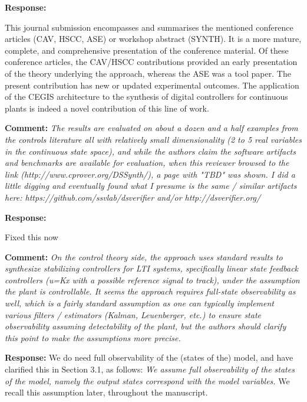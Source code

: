 \documentclass{article}
\begin{document}
{\bf Response: }

This journal submission encompasses and summarises the mentioned conference articles (CAV, HSCC, ASE) or workshop abstract (SYNTH). 
It is a more mature, complete, and comprehensive presentation of the conference material. 
Of these conference articles, the CAV/HSCC contributions provided an early presentation of the theory underlying the approach, 
whereas the ASE was a tool paper.  
The present contribution has new or updated experimental outcomes. 
The application of the CEGIS architecture to the synthesis of digital controllers for continuous plants is indeed a novel contribution of this line of
work. 


\vspace{2em}
{\bf Comment: } {\itshape The results are evaluated on about a dozen and a half examples from the controls literature all with relatively small
dimensionality (2 to 5 real variables in the continuous state space), and while the authors claim the software artifacts and benchmarks are available
for evaluation, when this reviewer browsed to the link (http://www.cprover.org/DSSynth/), a page with "TBD" was shown. I did a little digging and
eventually found what I presume is the same / similar artifacts here: https://github.com/ssvlab/dsverifier and/or http://dsverifier.org/}

\vspace{1em}
{\bf Response: }

Fixed this now


\vspace{2em}
{\bf Comment: } {\itshape On the control theory side, the approach uses standard results to synthesize stabilizing controllers for LTI systems,
specifically linear state feedback controllers (u=Kx with a possible reference signal to track), under the assumption the plant is controllable. It
seems the approach requires full-state observability as well, which is a fairly standard assumption as one can typically implement various filters /
estimators (Kalman, Leuenberger, etc.) to ensure state observability assuming detectability of the plant, but the authors should clarify this point to
make the assumptions more precise.}

\vspace{1em}
{\bf Response: }
We do need full observability of the (states of the) model, and have clarified this in Section 3.1, as follows: {\it We assume full observability of
the states of the model, namely the output states correspond with the model variables.  } We recall this assumption later, throughout the manuscript. 
\end{document}
